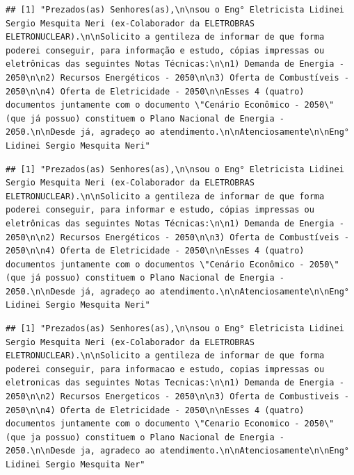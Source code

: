 \documentclass[]{article}
\newenvironment{Shaded}{\begin{snugshade}}{\end{snugshade}}
\newcommand{\KeywordTok}[1]{\textcolor[rgb]{0.13,0.29,0.53}{\textbf{#1}}}
\newcommand{\DecValTok}[1]{\textcolor[rgb]{0.00,0.00,0.81}{#1}}
\newcommand{\OperatorTok}[1]{\textcolor[rgb]{0.81,0.36,0.00}{\textbf{#1}}}
\newcommand{\NormalTok}[1]{#1}
\begin{document}
\begin{verbatim}
## [1] "Prezados(as) Senhores(as),\n\nsou o Eng° Eletricista Lidinei Sergio Mesquita Neri (ex-Colaborador da ELETROBRAS ELETRONUCLEAR).\n\nSolicito a gentileza de informar de que forma poderei conseguir, para informação e estudo, cópias impressas ou eletrônicas das seguintes Notas Técnicas:\n\n1) Demanda de Energia - 2050\n\n2) Recursos Energéticos - 2050\n\n3) Oferta de Combustíveis - 2050\n\n4) Oferta de Eletricidade - 2050\n\nEsses 4 (quatro) documentos juntamente com o documento \"Cenário Econômico - 2050\" (que já possuo) constituem o Plano Nacional de Energia - 2050.\n\nDesde já, agradeço ao atendimento.\n\nAtenciosamente\n\nEng° Lidinei Sergio Mesquita Neri"
\end{verbatim}

\begin{Shaded}
\end{Shaded}

\begin{verbatim}
## [1] "Prezados(as) Senhores(as),\n\nsou o Eng° Eletricista Lidinei Sergio Mesquita Neri (ex-Colaborador da ELETROBRAS ELETRONUCLEAR).\n\nSolicito a gentileza de informar de que forma poderei conseguir, para informar e estudo, cópias impressas ou eletrônicas das seguintes Notas Técnicas:\n\n1) Demanda de Energia - 2050\n\n2) Recursos Energéticos - 2050\n\n3) Oferta de Combustíveis - 2050\n\n4) Oferta de Eletricidade - 2050\n\nEsses 4 (quatro) documentos juntamente com o documentos \"Cenário Econômico - 2050\" (que já possuo) constituem o Plano Nacional de Energia - 2050.\n\nDesde já, agradeço ao atendimento.\n\nAtenciosamente\n\nEng° Lidinei Sergio Mesquita Neri"
\end{verbatim}

\begin{Shaded}
\end{Shaded}

\begin{verbatim}
## [1] "Prezados(as) Senhores(as),\n\nsou o Eng° Eletricista Lidinei Sergio Mesquita Neri (ex-Colaborador da ELETROBRAS ELETRONUCLEAR).\n\nSolicito a gentileza de informar de que forma poderei conseguir, para informacao e estudo, copias impressas ou eletronicas das seguintes Notas Tecnicas:\n\n1) Demanda de Energia - 2050\n\n2) Recursos Energeticos - 2050\n\n3) Oferta de Combustiveis - 2050\n\n4) Oferta de Eletricidade - 2050\n\nEsses 4 (quatro) documentos juntamente com o documento \"Cenario Economico - 2050\" (que ja possuo) constituem o Plano Nacional de Energia - 2050.\n\nDesde ja, agradeco ao atendimento.\n\nAtenciosamente\n\nEng° Lidinei Sergio Mesquita Ner"
\end{verbatim}
\end{document}
